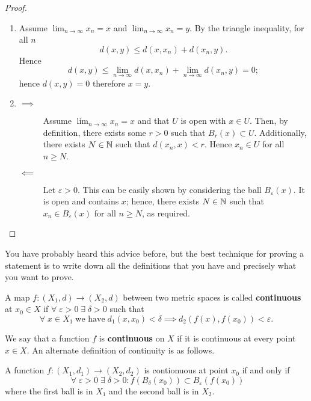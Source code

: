 \begin{proof}
    \begin{enumerate}
        \item Assume $\lim_{n \to \infty} x_n = x$ and $\lim_{n \to \infty} x_n = y$. By the triangle inequality, for all $n$
            \[ d(x, y) \leq d(x, x_n) + d(x_n, y). \]
            Hence
            \[ d(x, y) \leq \lim_{n\to\infty} d(x, x_n) + \lim_{n\to\infty} d(x_n, y) = 0; \]
            hence $d(x, y) = 0$ therefore $x = y$.

        \item
            \begin{description}
                \item[$\implies$] Assume $\lim_{n \to \infty} x_n = x$ and that $U$ is open with $x \in U$. Then, by definition, there exists some $r > 0$ such that $B_r(x) \subset U$. Additionally, there exists $N \in \mathbb{N}$ such that $d(x_n, x) < r$. Hence $x_n \in U$ for all $n \geq N$.
                \item[$\impliedby$] Let $\varepsilon > 0$. This can be easily shown by considering the ball $B_\varepsilon(x)$. It is open and contains $x$; hence, there exists $N \in \mathbb{N}$ such that $x_n \in B_\varepsilon(x)$ for all $n \geq N$, as required.
            \end{description}
    \end{enumerate}
\end{proof}

\begin{remark}
    You have probably heard this advice before, but the best technique for proving a statement is to write down all the definitions that you have and precisely what you want to prove.
\end{remark}

\begin{definition}[Continuity]
    A map $f: (X_1, d) \to (X_2, d)$ between two metric spaces is called \textbf{continuous} at $x_0 \in X$ if $\forall\; \varepsilon > 0 \;\exists\; \delta > 0$ such that 
    \[ \forall\; x \in X_1 \;\text{we have}\; d_1(x, x_0) < \delta \implies d_2(f(x), f(x_0)) < \varepsilon. \] 
\end{definition}

We say that a function $f$ is \textbf{continuous} on $X$ if it is continuous at every point $x \in X$. An alternate definition of continuity is as follows.

\begin{definition}
    A function $f : (X_1, d_1) \to (X_2, d_2)$ is contionuous at point $x_0$ if and only if
    \[ \;\forall\; \varepsilon > 0 \;\exists\; \delta > 0: f(B_\delta(x_0)) \subset B_\varepsilon(f(x_0)) \]
    where the first ball is in $X_1$ and the second ball is in $X_2$.
\end{definition}

